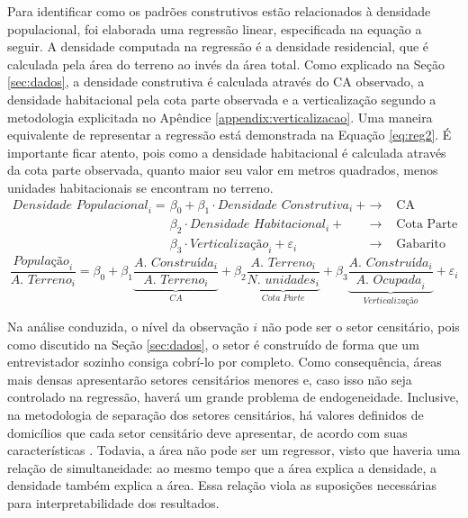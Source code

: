 Para identificar como os padrões construtivos estão relacionados à densidade populacional, foi elaborada uma regressão linear, especificada na equação a seguir. A densidade computada na regressão é a densidade residencial, que é calculada pela área do terreno ao invés da área total. Como explicado na Seção \ref{sec:dados}, a densidade construtiva é calculada através do CA observado, a densidade habitacional pela cota parte observada e a verticalização segundo a metodologia explicitada no Apêndice \ref{appendix:verticalizacao}. Uma maneira equivalente de representar a regressão está demonstrada na Equação \ref{eq:reg2}. É importante ficar atento, pois como a densidade habitacional é calculada através da cota parte observada, quanto maior seu valor em metros quadrados, menos unidades habitacionais se encontram no terreno. 
\begin{align}
    \textit{Densidade Populacional}_i =
    &\beta_0 + \beta_1 \cdot \textit{Densidade Construtiva}_i + & \rightarrow & \text{ CA}\nonumber\\
    &\beta_2 \cdot\textit{Densidade Habitacional}_i + & \rightarrow & \text{ Cota Parte} \\
    &\beta_3\cdot\textit{Verticalização}_i + \varepsilon_i & \rightarrow & \text{ Gabarito}\nonumber
    \label{eq:reg}
\end{align}
\begin{equation}
    \frac{\textit{População}_i}{\textit{A. Terreno}_i}=
    \beta_0+
    \beta_1\underbrace{\frac{\textit{A. Construída}_i}{\textit{A. Terreno}_i}}_\textit{CA}+
    \beta_2\underbrace{\frac{\textit{A. Terreno}_i}{\textit{N. unidades}_i}}_\textit{Cota Parte}+
    \beta_3\underbrace{\frac{\textit{A. Construída}_i}{\textit{A. Ocupada}_i}}_\textit{Verticalização}+\varepsilon_i
    \label{eq:reg2}
\end{equation}

Na análise conduzida, o nível da observação $i$ não pode ser o setor censitário, pois como discutido na Seção \ref{sec:dados}, o setor é construído de forma que um entrevistador sozinho consiga cobrí-lo por completo. Como consequência, áreas mais densas apresentarão setores censitários menores e, caso isso não seja controlado na regressão, haverá um grande problema de endogeneidade. Inclusive, na metodologia de separação dos setores censitários, há valores definidos de domicílios que cada setor censitário deve apresentar, de acordo com suas características \cite{IBGE2024}. Todavia, a área não pode ser um regressor, visto que haveria uma relação de simultaneidade: ao mesmo tempo que a área explica a densidade, a densidade também explica a área. Essa relação viola as suposições necessárias para interpretabilidade dos resultados.


